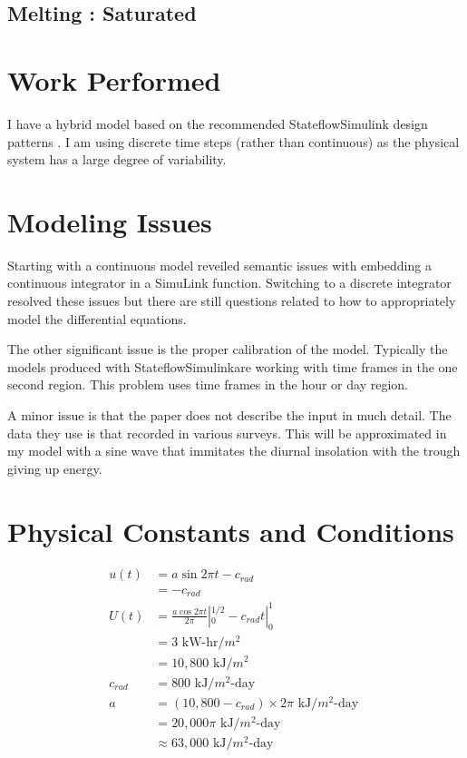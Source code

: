 \documentclass{article}
\begin{document}
\subsection{Melting : Saturated}

\section{Work Performed}

I have a hybrid model based on the recommended
Stateflow\textregistered Simulink\textregistered
design patterns \citep{matlab2009ssdp}.
I am using discrete time steps (rather than continuous) as the
physical system has a large degree of variability.

\section{Modeling Issues}

Starting with a continuous model reveiled semantic
issues with embedding a continuous integrator in a SimuLink function.
Switching to a discrete integrator resolved these issues but
there are still questions related to how to appropriately
model the differential equations.

The other significant issue is the proper calibration of the model.
Typically the models produced with
Stateflow\textregistered Simulink\textregistered are working
with time frames in the one second region.
This problem uses time frames in the hour or day region.

A minor issue is that the paper does not describe
the input in much detail.
The data they use is that recorded in various surveys.
This will be approximated in my model with a sine wave
that immitates the diurnal insolation with the trough
giving up energy.


\section{Physical Constants and Conditions}

\begin{align}
u(t) &= a \sin{2 \pi t} - c_{rad} \\
 &= - c_{rad} \\
U(t) &= \frac{a \cos{2 \pi t}}{2 \pi} |_0^{1/2} - c_{rad} t |_0^1 \\
  &= 3 \text{ kW-hr/$m^2$ } \\
  &= 10,800 \text{ kJ/$m^2$ } \\
c_{rad} &= 800 \text{ kJ/$m^2$-day } \\
a &= (10,800 - c_{rad}) \times 2 \pi \text{ kJ/$m^2$-day } \\
 &= 20,000 \pi \text{ kJ/$m^2$-day } \\
 &\approx 63,000 \text{ kJ/$m^2$-day }
\end{align}
\end{document}
